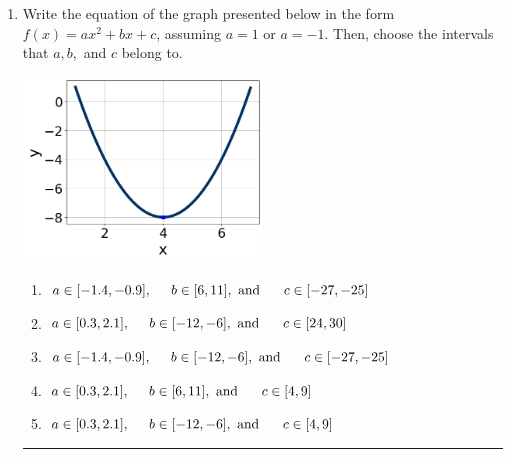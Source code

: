\documentclass[14pt]{extbook}
\newcommand{\litem}[1]{\item#1\hspace*{-1cm}\rule{\textwidth}{0.4pt}}
\begin{document}
\begin{enumerate}
{\begin{enumerate}[label=\Alph*.]
\end{enumerate} }
\litem{
Write the equation of the graph presented below in the form $f(x)=ax^2+bx+c$, assuming  $a=1$ or $a=-1$. Then, choose the intervals that $a, b,$ and $c$ belong to.
\begin{center}
    \includegraphics[width=0.5\textwidth]{../Figures/quadraticGraphToEquationC.png}
\end{center}
\begin{enumerate}[label=\Alph*.]
\item \( a \in [-1.4, -0.9], \hspace*{5mm} b \in [6, 11], \text{ and } \hspace*{5mm} c \in [-27, -25] \)
\item \( a \in [0.3, 2.1], \hspace*{5mm} b \in [-12, -6], \text{ and } \hspace*{5mm} c \in [24, 30] \)
\item \( a \in [-1.4, -0.9], \hspace*{5mm} b \in [-12, -6], \text{ and } \hspace*{5mm} c \in [-27, -25] \)
\item \( a \in [0.3, 2.1], \hspace*{5mm} b \in [6, 11], \text{ and } \hspace*{5mm} c \in [4, 9] \)
\item \( a \in [0.3, 2.1], \hspace*{5mm} b \in [-12, -6], \text{ and } \hspace*{5mm} c \in [4, 9] \)

\end{enumerate} }
\end{enumerate}
\end{document}
